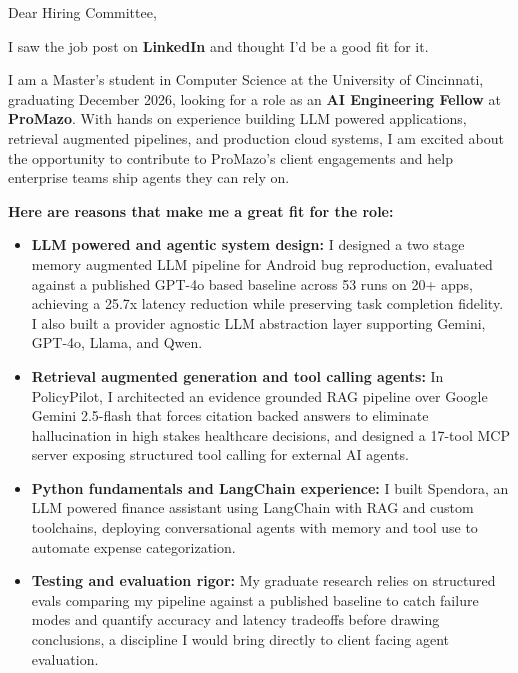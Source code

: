 \documentclass[11pt]{letter}
\date{}
\begin{document}
\begin{letter}{}

\opening{Dear Hiring Committee,}

I saw the job post on \textbf{LinkedIn} and thought I'd be a good fit for it.

I am a Master's student in Computer Science at the University of Cincinnati, graduating December 2026, looking for a role as an \textbf{AI Engineering Fellow} at \textbf{ProMazo}. With hands on experience building LLM powered applications, retrieval augmented pipelines, and production cloud systems, I am excited about the opportunity to contribute to ProMazo's client engagements and help enterprise teams ship agents they can rely on.

\textbf{Here are reasons that make me a great fit for the role:}

\begin{itemize}[leftmargin=*, itemsep=0.45em]
    \item \textbf{LLM powered and agentic system design:} I designed a two stage memory augmented LLM pipeline for Android bug reproduction, evaluated against a published GPT-4o based baseline across 53 runs on 20+ apps, achieving a 25.7x latency reduction while preserving task completion fidelity. I also built a provider agnostic LLM abstraction layer supporting Gemini, GPT-4o, Llama, and Qwen.

    \item \textbf{Retrieval augmented generation and tool calling agents:} In PolicyPilot, I architected an evidence grounded RAG pipeline over Google Gemini 2.5-flash that forces citation backed answers to eliminate hallucination in high stakes healthcare decisions, and designed a 17-tool MCP server exposing structured tool calling for external AI agents.

    \item \textbf{Python fundamentals and LangChain experience:} I built Spendora, an LLM powered finance assistant using LangChain with RAG and custom toolchains, deploying conversational agents with memory and tool use to automate expense categorization.

    \item \textbf{Testing and evaluation rigor:} My graduate research relies on structured evals comparing my pipeline against a published baseline to catch failure modes and quantify accuracy and latency tradeoffs before drawing conclusions, a discipline I would bring directly to client facing agent evaluation.


\end{itemize}
\end{letter}
\end{document}
